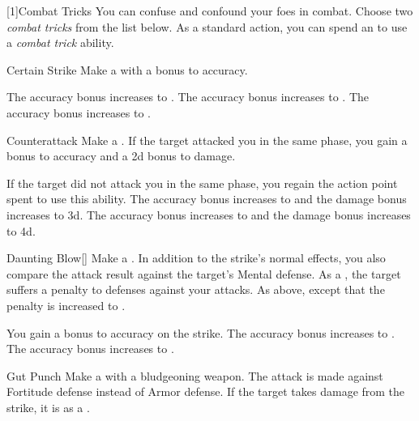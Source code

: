         [1]{Combat Tricks}
        You can confuse and confound your foes in combat.
        Choose two \textit{combat tricks} from the list below.
        As a standard action, you can spend an  to use a \textit{combat trick} ability.
        {
            \begin{ability}{Certain Strike}
                Make a  with a  bonus to accuracy.

                \rankline
                 The accuracy bonus increases to .
                 The accuracy bonus increases to .
                 The accuracy bonus increases to .
            \end{ability}

            \begin{ability}{Counterattack}
                Make a .
                If the target attacked you in the same phase, you gain a  bonus to accuracy and a \plus2d bonus to damage.

                \rankline
                 If the target did not attack you in the same phase, you regain the action point spent to use this ability.
                 The accuracy bonus increases to  and the damage bonus increases to \plus3d.
                 The accuracy bonus increases to  and the damage bonus increases to \plus4d.
            \end{ability}

            \begin{ability}{Daunting Blow}[]
                Make a .
                In addition to the strike's normal effects, you also compare the attack result against the target's Mental defense.
                \hit As a , the target suffers a  penalty to defenses against your attacks.
                \crit As above, except that the penalty is increased to .

                \rankline
                 You gain a  bonus to accuracy on the strike.
                 The accuracy bonus increases to .
                 The accuracy bonus increases to .
            \end{ability}

            \begin{ability}{Gut Punch}
                Make a  with a bludgeoning weapon.
                The attack is made against Fortitude defense instead of Armor defense.
                If the target takes damage from the strike, it is \sickened as a .


\end{ability}}
